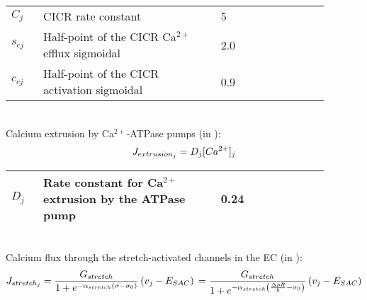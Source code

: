 \documentclass[fleqn]{report}
\numberwithin{equation}{section}
\numberwithin{equation}{section}
\begin{document}
							\begin{table}[h!]
							\centering
							\begin{tabular}{ p{0.09\linewidth}  >{\footnotesize} p{0.5\linewidth}  >{\footnotesize} p{0.27\linewidth} >{\footnotesize} p{0.03\linewidth} }
							\hline
							$C_{j}$      			& CICR rate constant									& 5 \uMs		& \cite{Koenigsberger2006} \\
							$s_{cj}$				& Half-point of the CICR Ca$^{2+}$ efflux sigmoidal			& 2.0 \uM		& \cite{Koenigsberger2006} \\
							$c_{cj}$				& Half-point of the CICR activation sigmoidal			& 0.9 \uM		& \cite{Koenigsberger2006} \\
							\hline
							\end{tabular}
							\label{tab:JCICRj}
							\end{table}
							\\
							Calcium extrusion by Ca$^{2+}$-ATPase pumps (in \uMs):
							\begin{equation} \label{eq:Jextrusionj}
							J_{extrusion_{j}} = D_{j}[Ca^{2+}]_{j} 
							\end{equation}
							\begin{table}[h!]
							\centering
							\begin{tabular}{ p{0.09\linewidth}  >{\footnotesize} p{0.5\linewidth}  >{\footnotesize} p{0.27\linewidth} >{\footnotesize} p{0.03\linewidth} }
							\hline
							$D_{j}$      			& Rate constant for Ca$^{2+}$ extrusion by the ATPase pump		 & 0.24	\pers			& \cite{Koenigsberger2005} \\
							\hline
							\end{tabular}
							\label{tab:Jextrusionj}
							\end{table}
							\\ 
							Calcium flux through the stretch-activated channels in the EC (in \uMs): 
							\begin{equation} \label{eq:Jstretchj}
							J_{stretch_{j}}= \frac{G_{stretch}}{1+ e^{-\alpha_{stretch}  \left(  \sigma -\sigma_{0}   \right) }}  \left(  v_{j}-E_{SAC}   \right) \\
							= \frac{G_{stretch}}{1+ e^{-\alpha_{stretch}  \left(  \frac{\Delta pR}{h} -\sigma_{0}   \right) }}  \left(  v_{j}-E_{SAC}   \right) 
							\end{equation}
\end{document}

